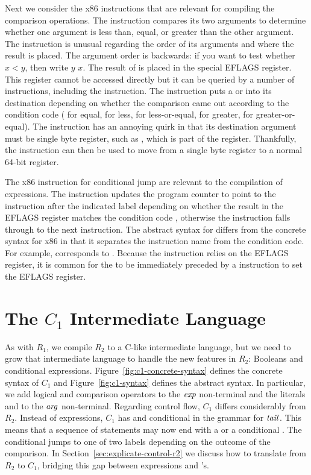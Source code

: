 \documentclass[11pt]{book}
\begin{document}
Next we consider the x86 instructions that are relevant for compiling
the comparison operations. The  instruction compares its two
arguments to determine whether one argument is less than, equal, or
greater than the other argument. The  instruction is unusual
regarding the order of its arguments and where the result is
placed. The argument order is backwards: if you want to test whether
$x < y$, then write  $y$\code{,} $x$. The result of
 is placed in the special EFLAGS register. This register
cannot be accessed directly but it can be queried by a number of
instructions, including the  instruction. The 
instruction puts a  or  into its destination depending
on whether the comparison came out according to the condition code
 ( for equal,  for less,  for
less-or-equal,  for greater,  for greater-or-equal).
The  instruction has an annoying quirk in that its
destination argument must be single byte register, such as ,
which is part of the  register.  Thankfully, the
 instruction can then be used to move from a single byte
register to a normal 64-bit register.

The x86 instruction for conditional jump are relevant to the
compilation of  expressions.  The  instruction
updates the program counter to point to the instruction after the
indicated label depending on whether the result in the EFLAGS register
matches the condition code , otherwise the 
instruction falls through to the next instruction.  The abstract
syntax for  differs from the concrete syntax for x86 in
that it separates the instruction name from the condition code. For
example,  corresponds to .  Because
the  instruction relies on the EFLAGS register, it is
common for the  to be immediately preceded by a 
instruction to set the EFLAGS register.


\section{The $C_1$ Intermediate Language}
\label{sec:c1}

As with $R_1$, we compile $R_2$ to a C-like intermediate language, but
we need to grow that intermediate language to handle the new features
in $R_2$: Booleans and conditional expressions.
Figure~\ref{fig:c1-concrete-syntax} defines the concrete syntax of
$C_1$ and Figure~\ref{fig:c1-syntax} defines the abstract syntax.  In
particular, we add logical and comparison operators to the $\mathit{exp}$
non-terminal and the literals  and  to the $\mathit{arg}$
non-terminal.  Regarding control flow, $C_1$ differs considerably from
$R_2$.  Instead of  expressions, $C_1$ has  and
conditional  in the grammar for $\mathit{tail}$. This means that a
sequence of statements may now end with a  or a conditional
. The conditional  jumps to one of two labels
depending on the outcome of the comparison. In
Section~\ref{sec:explicate-control-r2} we discuss how to translate
from $R_2$ to $C_1$, bridging this gap between  expressions
and 's.
\end{document}
